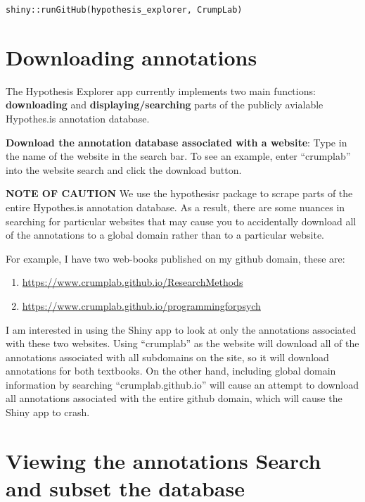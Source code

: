 \documentclass[
]{book}
\providecommand{\tightlist}{%
  \setlength{\itemsep}{0pt}\setlength{\parskip}{0pt}}
\begin{document}
\texttt{shiny::runGitHub(\textquotesingle{}hypothesis\_explorer\textquotesingle{},\ \textquotesingle{}CrumpLab\textquotesingle{})}

\hypertarget{downloading-annotations}{%
\section{Downloading annotations}\label{downloading-annotations}}

The Hypothesis Explorer app currently implements two main functions: \textbf{downloading} and \textbf{displaying/searching} parts of the publicly avialable Hypothes.is annotation database.

\textbf{Download the annotation database associated with a website}: Type in the name of the website in the search bar. To see an example, enter ``crumplab'' into the website search and click the download button.

\textbf{NOTE OF CAUTION} We use the hypothesisr package to scrape parts of the entire Hypothes.is annotation database. As a result, there are some nuances in searching for particular websites that may cause you to accidentally download all of the annotations to a global domain rather than to a particular website.

For example, I have two web-books published on my github domain, these are:

\begin{enumerate}
\def\labelenumi{\arabic{enumi}.}
\tightlist
\item
  \url{https://www.crumplab.github.io/ResearchMethods}
\item
  \url{https://www.crumplab.github.io/programmingforpsych}
\end{enumerate}

I am interested in using the Shiny app to look at only the annotations associated with these two websites. Using ``crumplab'' as the website will download all of the annotations associated with all subdomains on the site, so it will download annotations for both textbooks. On the other hand, including global domain information by searching ``crumplab.github.io'' will cause an attempt to download all annotations associated with the entire github domain, which will cause the Shiny app to crash.

\hypertarget{viewing-the-annotations-search-and-subset-the-database}{%
\section{Viewing the annotations Search and subset the database}\label{viewing-the-annotations-search-and-subset-the-database}}
\end{document}
